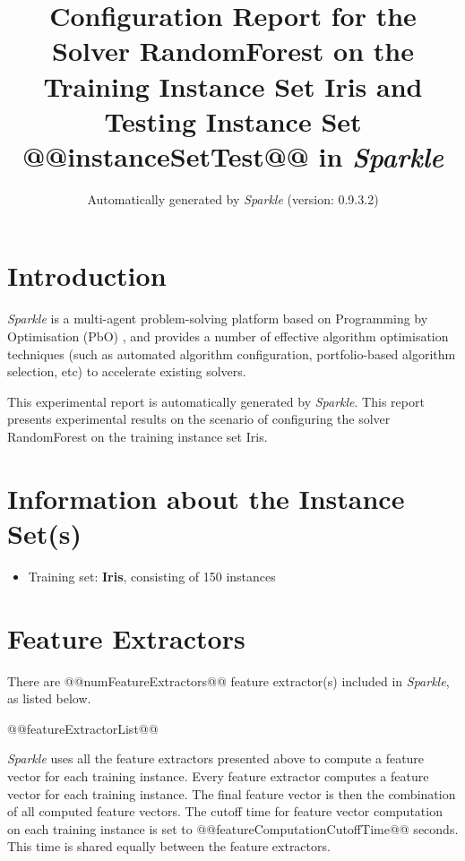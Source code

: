 \documentclass[british]{article}
\title{Configuration Report for the Solver RandomForest on the Training Instance Set Iris \iftest and Testing Instance Set @@instanceSetTest@@ \fi in \emph{Sparkle} }
\author{ Automatically generated by \emph{Sparkle} (version: 0.9.3.2) }
\newif\iftest
\newif\iffeatures
\begin{document}
\maketitle %


\section{Introduction}
\label{sec:Introduction}

\emph{Sparkle} \cite{Hoos15} is a multi-agent problem-solving platform based on Programming by Optimisation (PbO) \cite{Hoos12}, and provides a number of effective algorithm optimisation techniques (such as automated algorithm configuration, portfolio-based algorithm selection, etc) to accelerate existing solvers.

This experimental report is automatically generated by \emph{Sparkle}. This report presents experimental results on the scenario of configuring the solver RandomForest on the training instance set Iris\iftest~and evaluating it on the testing instance set @@instanceSetTest@@\fi.


\section{Information about the Instance Set(s)}

\begin{itemize}
\item Training set: \textbf{Iris}, consisting of 150 instances
\iftest\item \textbf{@@instanceSetTest@@}, consisting of @@numInstanceInTestingInstanceSet@@ instances\fi
\end{itemize}


\iffeatures
    \section{Feature Extractors}
        There are @@numFeatureExtractors@@ feature extractor(s) included in \emph{Sparkle}, as listed below.

        \begin{enumerate}
        @@featureExtractorList@@
        \end{enumerate}

        \emph{Sparkle} uses all the feature extractors presented above to compute a feature vector for each training instance. Every feature extractor computes a feature vector for each training instance. The final feature vector is then the combination of all computed feature vectors. The cutoff time for feature vector computation on each training instance is set to @@featureComputationCutoffTime@@ seconds. This time is shared equally between the feature extractors.
\end{document}
